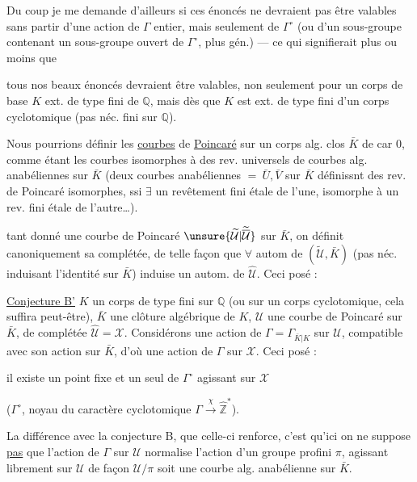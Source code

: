 Du coup je me demande d'ailleurs si ces énoncés ne devraient pas être valables sans partir d'une action de $\Gamma$  entier, mais seulement de $\Gamma^\circ$ (ou d'un sous-groupe contenant un sous-groupe ouvert de $\Gamma^\circ$, plus gén.) --- ce qui signifierait plus ou moins que

tous nos beaux énoncés devraient être valables, non seulement pour un corps de base $K$ ext. de type fini de $\mathbb{Q}$, mais dès que $K$ est ext. de type fini d'un corps cyclotomique (pas néc. fini sur $\mathbb{Q}$).

Nous pourrions définir les \uline{courbes} de \uline{Poincaré} sur un corps alg. clos $\bar K$ de car $0$, comme étant les courbes isomorphes à des rev. universels de courbes alg. anabéliennes sur $\bar K$ (deux courbes anabéliennes $=\ \bar U,\bar V$ sur $\bar K$ définissnt des rev. de Poincaré isomorphes, ssi $\exists$ un revêtement fini étale de l'une, isomorphe à un rev. fini étale de l'autre\ldots).

tant donné une courbe de Poincaré $\unsure{\widetilde{\mathcal U}|\widetilde{\overline{\mathcal U}}}$ sur $\bar K$,  on définit canoniquement sa complétée, de telle façon que $\forall$ autom de $(\widetilde{\mathcal U},\bar K)$ (pas néc. induisant l'identité sur $\bar K$) induise un autom. de $\widehat{\mathcal U}$.
Ceci posé :

\uline{Conjecture B'}  $K$ un corps de type fini sur $\mathbb{Q}$ (ou sur un corps cyclotomique, cela suffira peut-être), $\bar K$ une clôture algébrique de $K$, $\mathcal U$ une courbe de Poincaré sur $\bar K$, de complétée $\widehat{\mathcal U}=\mathcal X$. Considérons une action de $\Gamma=\Gamma_{\bar K|K}$ sur $\mathcal U$, compatible avec son action sur $\bar K$, d'où une action de $\Gamma$ sur $\mathcal X$. Ceci posé :

il existe un point fixe et un seul de $\Gamma^\circ$ agissant sur $\mathcal X$

($\Gamma^\circ$, noyau du caractère cyclotomique $\Gamma\xrightarrow{\chi}\widehat{\mathbb Z}^{\!*}$).

La différence avec la conjecture B, que celle-ci renforce, c'est qu'ici on ne suppose \uline{pas} que l'action de $\Gamma$ sur $\mathcal U$ normalise l'action d'un groupe profini $\pi$, agissant librement sur $\mathcal U$ de façon  $\mathcal U/\pi$ soit une courbe alg. anabélienne sur $\bar K$.

